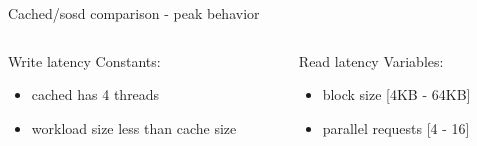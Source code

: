 \begin{frame}{Cached/sosd comparison - peak behavior}
	\begin{columns}[t]
		\begin{column}{.5\textwidth}
			Write latency
			Constants:
			\begin{itemize}
				\item cached has 4 threads
				\item workload size less than cache size
			\end{itemize}
		\end{column}
		\begin{column}{.5\textwidth}
			Read latency
			Variables:
			\begin{itemize}
				\item block size [4KB - 64KB]
				\item parallel requests [4 - 16]
			\end{itemize}
		\end{column}
	\end{columns}

\end{frame}

